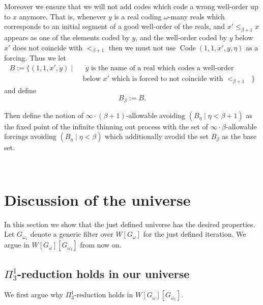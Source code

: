 \documentclass[a4paper,11pt]{article}
\begin{document}
Moreover we ensure that we will not add codes which code a wrong well-order up to $x$ anymore. That is, whenever $y$ is a real coding $\omega$-many reals which corresponds to an initial segment of a good well-order of the reals, and $x' \le_{\beta+1} x$ appears as one of the elements coded by $y$, and the well-order coded by $y$ below $x'$ does not coincide with $<_{\beta+1}$ then we must not use $\operatorname{Code} (1,1,x',y,\eta)$ as a forcing. Thus we let 
\begin{align*}
B:= \{ (1,1,x',\dot{y}) \mid &\text{ $\dot{y}$ is the name of a real which codes a well-order} \\& \text{ below $x'$ which is forced to  not coincide with $<_{\beta+1}$ } \}
\end{align*}
\[  \]
and define
\[B_{\beta} :=  B. \]

Then define the notion of $\infty \cdot (\beta+1)$-allowable avoiding $(B_{\eta} \mid \eta <\beta+1)$ as the fixed point of the infinite thinning out process with the set of $\infty \cdot \beta$-allowable forcings avoiding $(B_{\eta} \mid \eta < \beta)$ which additionally avodid the set $B_{\beta}$ as the base set. 




    ﻿
    ﻿
  \section{Discussion of the universe}

In this section we show that the just defined universe has the desired properties.
Let $G_{\omega_1}$ denote a generic filter over $W[G_{\omega}]$ for the just defined iteration. We argue in $W[G_{\omega}][G_{\omega_1}]$ from now on.

\subsection{\texorpdfstring{$\Pi^1_3$}{Pi13}-reduction holds in our universe}
We first argue why $\Pi^1_3$-reduction holds in  $W[G_{\omega}][G_{\omega_1}]$.
\end{document}
